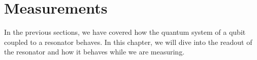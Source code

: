\chapter{Measurements}
In the previous sections, we have covered how the quantum system of a qubit coupled to a resonator behaves. In this chapter, we will dive into the readout of the resonator and how it behaves while we are measuring.


